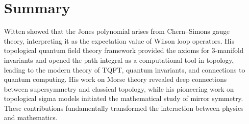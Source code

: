 \section*{Summary}

Witten showed that the Jones polynomial arises from Chern--Simons gauge theory, interpreting it as the expectation value of Wilson loop operators. His topological quantum field theory framework provided the axioms for 3-manifold invariants and opened the path integral as a computational tool in topology, leading to the modern theory of TQFT, quantum invariants, and connections to quantum computing. His work on Morse theory revealed deep connections between supersymmetry and classical topology, while his pioneering work on topological sigma models initiated the mathematical study of mirror symmetry. These contributions fundamentally transformed the interaction between physics and mathematics.
